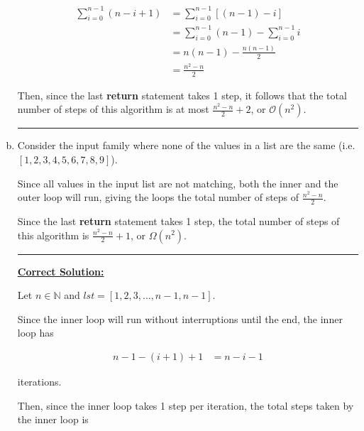 \documentclass[12pt]{article}
\begin{document}
\begin{enumerate}[a.]
    \begin{align}
        \sum\limits_{i=0}^{n-1} (n - i + 1) &= \sum\limits_{i=0}^{n-1} \left[ (n-1) - i \right]\\
        &= \sum\limits_{i=0}^{n-1} (n-1) - \sum\limits_{i=0}^{n-1} i\\
        &= n(n-1) - \frac{n(n-1)}{2}\\
        &= \frac{n^2-n}{2}
    \end{align}

    \bigskip

    Then, since the last \textbf{return} statement takes 1 step, it follows
    that the total number of steps of this algorithm is at most
    $\frac{n^2-n}{2} + 2$, or $\mathcal{O}(n^2)$.
    \noindent\rule{\textwidth}{1pt}

    \item

    Consider the input family where none of the values in a list are the same
    (i.e. $[1,2,3,4,5,6,7,8,9]$).

    \bigskip

    Since all values in the input list are not matching, both the inner and
    the outer loop will run, giving the loops the total number of steps
    of $\frac{n^2-n}{2}$.

    \bigskip

    Since the last \textbf{return} statement takes 1 step, the total number of
    steps of this algorithm is $\frac{n^2-n}{2} + 1$, or $\Omega(n^2)$.

    \noindent\rule{\textwidth}{1pt}

    \bigskip

    \underline{\textbf{Correct Solution:}}

    \bigskip

    Let $n \in \mathbb{N}$ and $lst = [1,2,3,\dots,n-1,n-1]$.

    \bigskip

    Since the inner loop will run without interruptions until the end, the
    inner loop has

    \setcounter{equation}{0}
    \begin{align}
        n-1-(i+1) + 1 &= n-i-1
    \end{align}

    iterations.

    \bigskip

    Then, since the inner loop takes 1 step per iteration, the total steps
    taken by the inner loop is


\end{enumerate}
\end{document}
